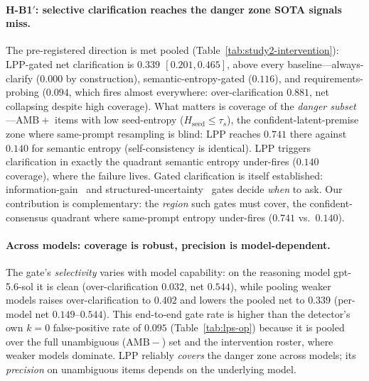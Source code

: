 \documentclass[acmsmall,screen,review,anonymous]{acmart}
\newcommand{\Hseed}{\ensuremath{H_{\mathrm{seed}}}}
\begin{document}
\paragraph{H-B1$'$: selective clarification reaches the danger zone SOTA signals miss.} The pre-registered
direction is met pooled (Table~\ref{tab:study2-intervention}): LPP-gated net clarification is
\textbf{$0.339$ $[0.201, 0.465]$}, above every baseline---always-clarify ($0.000$ by construction),
semantic-entropy-gated ($0.116$), and requirements-probing ($0.094$, which fires almost everywhere:
over-clarification $0.881$, net collapsing despite high coverage). What matters is coverage of the
\emph{danger subset}---$\mathrm{AMB}{+}$ items with low seed-entropy ($\Hseed\!\le\!\tau_s$), the
confident-latent-premise zone where same-prompt resampling is blind: LPP reaches \textbf{$0.741$} there
against \textbf{$0.140$} for semantic entropy (self-consistency is identical). LPP triggers clarification in
exactly the quadrant semantic entropy under-fires ($0.140$ coverage), where the failure lives. Gated
clarification is itself established: information-gain~\cite{deng2026infogain} and
structured-uncertainty~\cite{suri2025structured} gates decide \emph{when} to ask. Our contribution is
complementary: the \emph{region} such gates must cover, the confident-consensus quadrant where same-prompt
entropy under-fires ($0.741$ vs.\ $0.140$).

\paragraph{Across models: coverage is robust, precision is model-dependent.} The gate's \emph{selectivity}
varies with model capability: on the reasoning model gpt-5.6-sol it is clean (over-clarification $0.032$, net
$0.544$), while pooling weaker models raises over-clarification to $0.402$ and lowers the pooled net to
$0.339$ (per-model net $0.149$--$0.544$). This end-to-end gate rate is higher than the detector's own $k{=}0$
false-positive rate of $0.095$ (Table~\ref{tab:lps-op}) because it is pooled over the full unambiguous
($\mathrm{AMB}{-}$) set and the intervention roster, where weaker models dominate. LPP reliably \emph{covers}
the danger zone across models; its \emph{precision} on unambiguous items depends on the underlying model.
\end{document}
